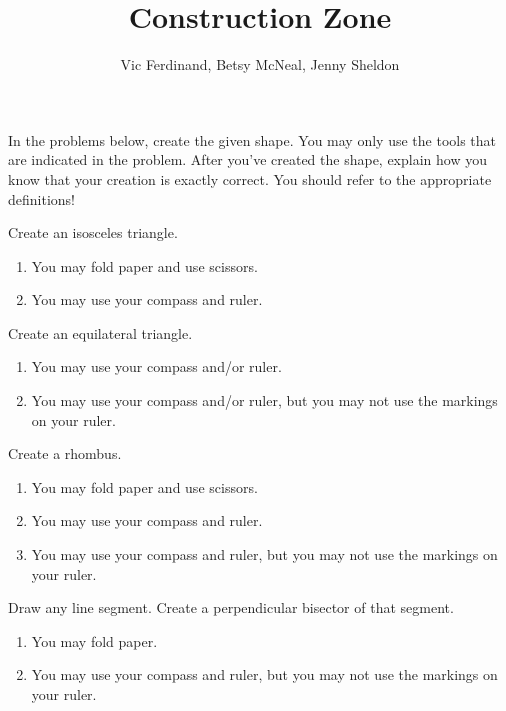 \documentclass{ximera}
\title{Construction Zone}
\author{Vic Ferdinand, Betsy McNeal, Jenny Sheldon}
\begin{document}
\begin{abstract}
\end{abstract}
\maketitle



In the problems below, create the given shape.  You may only use the tools that are indicated in the problem.  After you've created the shape, explain how you know that your creation is exactly correct.  You should refer to the appropriate definitions!

\begin{problem}
Create an isosceles triangle.
\begin{enumerate}
\item You may fold paper and use scissors.
\item You may use your compass and ruler.
\end{enumerate}
\end{problem}

\begin{problem}
Create an equilateral triangle.
\begin{enumerate}

\item You may use your compass and/or ruler.
\item You may use your compass and/or ruler, but you may not use the markings on your ruler.
\end{enumerate}
\end{problem}

\begin{problem}
Create a rhombus.
\begin{enumerate}
\item You may fold paper and use scissors.
\item You may use your compass and ruler.
\item You may use your compass and ruler, but you may not use the markings on your ruler.
\end{enumerate}
\end{problem}

\begin{problem}
Draw any line segment.  Create a perpendicular bisector of that segment.
\begin{enumerate}
\item You may fold paper.
\item You may use your compass and ruler, but you may not use the markings on your ruler.
\end{enumerate}
\end{problem}
\end{document}
